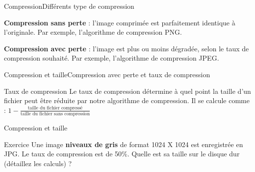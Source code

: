 \documentclass{beamer}
\begin{document}
\begin{frame}{Compression}{Différents type de compression}
	\begin{definition}
		\textbf<1,3->{Compression sans perte} : l’image comprimée est parfaitement identique à l’originale. Par exemple, l'algorithme de compression PNG.
	\end{definition}
	\begin{definition}
		\textbf<2->{Compression avec perte} : l’image est plus ou moins dégradée, selon le taux de compression souhaité. Par exemple, l'algorithme de compression JPEG.
	\end{definition}

\end{frame}

\begin{frame}{Compression et taille}{Compression avec perte et taux de compression}
	\begin{block}{Taux de compression}
		Le taux de compression détermine à quel point la taille d'un fichier peut être réduite par notre algorithme de compression. Il se calcule comme : $1-\frac{\text{taille du fichier compressé}}{\text{taille du fichier sans compression}}$
	\end{block}

\end{frame}

\begin{frame}{Compression et taille}{}
	\begin{alertblock}{Exercice}
		Une image \textbf{niveaux de gris} de format 1024 X 1024 est enregistrée en JPG. Le taux de compression est de 50\%. Quelle est sa taille sur le disque dur (détaillez les calculs) ?
	\end{alertblock}
\end{frame}
\end{document}
